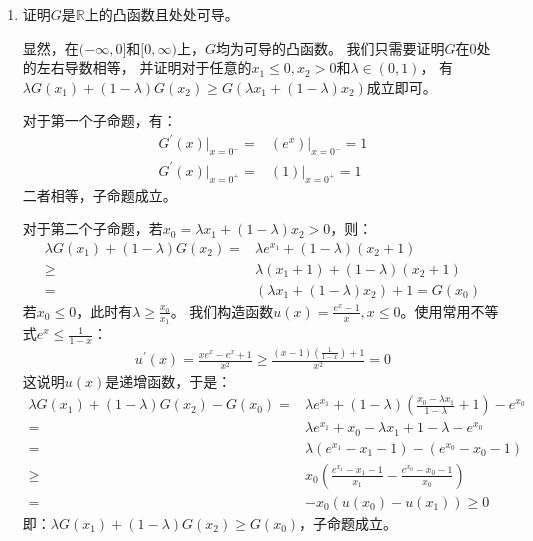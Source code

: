 \documentclass[12pt, a4paper]{article}
\begin{document}
        \begin{enumerate}

        \item 证明$G$是$\mathbb{R}$上的凸函数且处处可导。

            显然，在$(-\infty, 0]$和$[0, \infty)$上，$G$均为可导的凸函数。
            我们只需要证明$G$在$0$处的左右导数相等，
            并证明对于任意的$x_1 \le 0, x_2 > 0$和$\lambda \in (0, 1)$，
            有$\lambda G(x_1) + (1 - \lambda) G(x_2) \ge G(\lambda x_1 + (1 - \lambda) x_2)$成立即可。

            对于第一个子命题，有：
            \begin{align*}
            G^\prime(x) \vert_{x = 0^-} =& (e^x) \vert_{x = 0^-} = 1 \\
            G^\prime(x) \vert_{x = 0^+} =& (1) \vert_{x = 0^+} = 1
            \end{align*}
            二者相等，子命题成立。

            对于第二个子命题，若$x_0 = \lambda x_1 + (1 - \lambda) x_2 > 0$，则：
            \begin{align*}
            \lambda G(x_1) + (1 - \lambda) G(x_2)
            =& \lambda e^{x_1} + (1 - \lambda) (x_2 + 1) \\
            \ge& \lambda (x_1 + 1) + (1 - \lambda) (x_2 + 1) \\
            =& (\lambda x_1 + (1 - \lambda) x_2) + 1 = G(x_0)
            \end{align*}
            若$x_0 \le 0$，此时有$\lambda \ge \frac{x_0}{x_1}$。
            我们构造函数$u(x) = \frac{e^{x} - 1}{x}, x \le 0$。使用常用不等式$e^x \le \frac{1}{1 - x}$：
            \begin{align*}
            u^\prime(x) = \frac{x e^x - e^x + 1}{x^2} \ge \frac{(x - 1)(\frac{1}{1 - x}) + 1}{x^2} = 0
            \end{align*}
            这说明$u(x)$是递增函数，于是：
            \begin{align*}
            \lambda G(x_1) + (1 - \lambda) G(x_2) - G(x_0)
            =& \lambda e^{x_1} + (1 - \lambda) (\frac{x_0 - \lambda x_1}{1 - \lambda} + 1) - e^{x_0} \\
            =& \lambda e^{x_1} + x_0 - \lambda x_1 + 1 - \lambda - e^{x_0} \\
            =& \lambda (e^{x_1} - x_1 - 1) - (e^{x_0} - x_0 - 1) \\
            \ge& x_0 (\frac{e^{x_1} - x_1 - 1}{x_1} - \frac{e^{x_0} - x_0 - 1}{x_0}) \\
            =& -x_0 (u(x_0) - u(x_1)) \ge 0
            \end{align*}
            即：$\lambda G(x_1) + (1 - \lambda) G(x_2) \ge G(x_0)$，子命题成立。


\end{enumerate}
\end{document}
